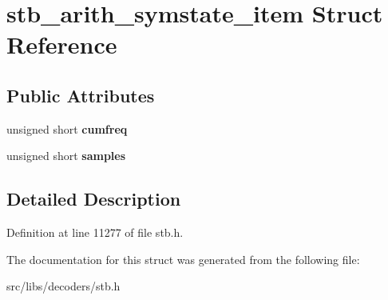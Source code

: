 \hypertarget{structstb__arith__symstate__item}{\section{stb\-\_\-arith\-\_\-symstate\-\_\-item Struct Reference}
\label{structstb__arith__symstate__item}
}
\subsection*{Public Attributes}
\begin{DoxyCompactItemize}
\item 
\hypertarget{structstb__arith__symstate__item_a7a037703bf5e2e3dcca7baad936a582b}{unsigned short {\bfseries cumfreq}}\label{structstb__arith__symstate__item_a7a037703bf5e2e3dcca7baad936a582b}

\item 
\hypertarget{structstb__arith__symstate__item_adf49aaee14629a8f2e6343e9343796ea}{unsigned short {\bfseries samples}}\label{structstb__arith__symstate__item_adf49aaee14629a8f2e6343e9343796ea}

\end{DoxyCompactItemize}


\subsection{Detailed Description}


Definition at line 11277 of file stb.\-h.



The documentation for this struct was generated from the following file\-:\begin{DoxyCompactItemize}
\item 
src/libs/decoders/stb.\-h\end{DoxyCompactItemize}

